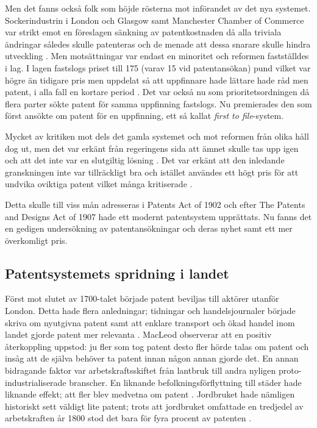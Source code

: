 Men det fanns också folk som höjde rösterna mot införandet av det nya systemet. Sockerindustrin i London och Glasgow samt Manchester Chamber of Commerce var strikt emot en föreslagen sänkning av patentkostnaden då alla triviala ändringar således skulle patenteras och de menade att dessa snarare skulle hindra utveckling \cite{dutton}. Men motsättningar var endast en minoritet och reformen fastställdes i lag. I lagen fastslogs priset till 175 (varav 15 vid patentansökan) pund vilket var högre än tidigare pris men uppdelat så att uppfinnare hade lättare hade råd men patent, i alla fall en kortare period \cite{dutton}. Det var också nu som prioritetsordningen då flera parter sökte patent för samma uppfinning fastslogs. Nu premierades den som först ansökte om patent för en uppfinning, ett så kallat \emph{first to file}-system\cite{webster}.


Mycket av kritiken mot dels det gamla systemet och mot reformen från olika håll dog ut, men det var erkänt från regeringens sida att ämnet skulle tas upp igen och att det inte var en slutgiltig lösning \cite{dutton}. Det var erkänt att den inledande granskningen inte var tillräckligt bra och istället användes ett högt pris för att undvika oviktiga patent vilket många kritiserade \cite{dutton}.

Detta skulle till viss mån adresseras i Patents Act of 1902 och efter The Patents 
and Designs Act of 1907 hade ett modernt patentsystem upprättats. Nu fanns det en gedigen undersökning av patentansökningar och deras nyhet samt ett mer överkomligt pris\cite{macleod}.







\subsection{Patentsystemets spridning i landet}

Först mot slutet av 1700-talet började patent beviljas till aktörer utanför London. Detta hade flera
anledningar; tidningar och handelsjournaler började skriva om nyutgivna patent samt att  enklare transport och
ökad handel inom landet gjorde patent mer relevanta \cite{macleod}. MacLeod observerar att en positiv återkoppling uppstod: ju fler som tog
patent desto fler hörde talas om patent och insåg att de själva behöver ta patent innan någon annan gjorde
det. En annan bidragande faktor var arbetskraftsskiftet från lantbruk till andra nyligen
proto-industrialiserade branscher. En liknande befolkningsförflyttning till städer hade liknande effekt;
att fler blev medvetna om patent \cite{macleod}. Jordbruket hade nämligen historiskt sett väldigt lite patent; trots att
jordbruket omfattade en tredjedel av arbetskraften år 1800 stod det bara för fyra procent av patenten
\cite{macleod2}.

